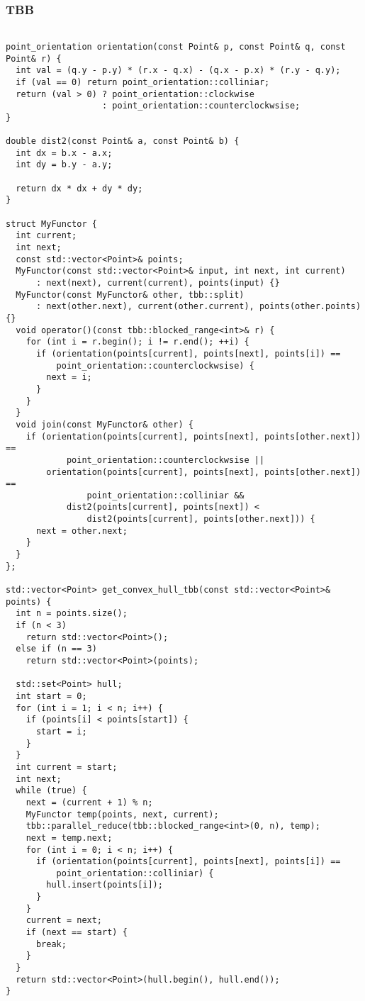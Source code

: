 \documentclass[14pt, a4paper]{extarticle}
\begin{document}
    \subsubsection{TBB}
  \begin{lstlisting}

point_orientation orientation(const Point& p, const Point& q, const Point& r) {
  int val = (q.y - p.y) * (r.x - q.x) - (q.x - p.x) * (r.y - q.y);
  if (val == 0) return point_orientation::colliniar;
  return (val > 0) ? point_orientation::clockwise
                   : point_orientation::counterclockwsise;
}

double dist2(const Point& a, const Point& b) {
  int dx = b.x - a.x;
  int dy = b.y - a.y;

  return dx * dx + dy * dy;
}

struct MyFunctor {
  int current;
  int next;
  const std::vector<Point>& points;
  MyFunctor(const std::vector<Point>& input, int next, int current)
      : next(next), current(current), points(input) {}
  MyFunctor(const MyFunctor& other, tbb::split)
      : next(other.next), current(other.current), points(other.points) {}
  void operator()(const tbb::blocked_range<int>& r) {
    for (int i = r.begin(); i != r.end(); ++i) {
      if (orientation(points[current], points[next], points[i]) ==
          point_orientation::counterclockwsise) {
        next = i;
      }
    }
  }
  void join(const MyFunctor& other) {
    if (orientation(points[current], points[next], points[other.next]) ==
            point_orientation::counterclockwsise ||
        orientation(points[current], points[next], points[other.next]) ==
                point_orientation::colliniar &&
            dist2(points[current], points[next]) <
                dist2(points[current], points[other.next])) {
      next = other.next;
    }
  }
};

std::vector<Point> get_convex_hull_tbb(const std::vector<Point>& points) {
  int n = points.size();
  if (n < 3)
    return std::vector<Point>();
  else if (n == 3)
    return std::vector<Point>(points);

  std::set<Point> hull;
  int start = 0;
  for (int i = 1; i < n; i++) {
    if (points[i] < points[start]) {
      start = i;
    }
  }
  int current = start;
  int next;
  while (true) {
    next = (current + 1) % n;
    MyFunctor temp(points, next, current);
    tbb::parallel_reduce(tbb::blocked_range<int>(0, n), temp);
    next = temp.next;
    for (int i = 0; i < n; i++) {
      if (orientation(points[current], points[next], points[i]) ==
          point_orientation::colliniar) {
        hull.insert(points[i]);
      }
    }
    current = next;
    if (next == start) {
      break;
    }
  }
  return std::vector<Point>(hull.begin(), hull.end());
}

  \end{lstlisting}
  \newpage
\end{document}
